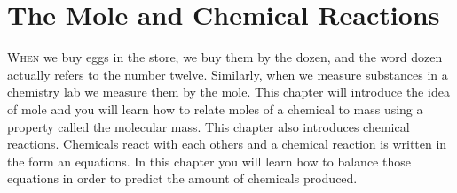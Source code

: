 \documentclass[main.tex]{subfiles}
\newcommand\chapterlabel{Ch-mole}\setcounter{figurenewcounter}{0}\setcounter{tablenewcounter}{0}\setcounter{formulanewcounter}{0}\chapterpicture{../{\chapterlabel}/figure1}\chapterpicturelabel{PngImg}
\begin{document}
 

\chapter[The Mole and Chemical Reactions ]{The Mole and Chemical Reactions}
%



\lettrine[lines=4]{\color{black!45}W}{hen} we buy eggs in the store, we buy them by the dozen, and the word dozen actually refers to the number twelve. Similarly, when we measure substances in a chemistry lab we measure them by the mole. This chapter will introduce the idea of mole and you will learn how to relate moles of a chemical to mass using a property called the molecular mass. This chapter also introduces chemical reactions. Chemicals react with each others and a chemical reaction is written in the form an equations. In this chapter you will learn how to balance those equations in order to predict the amount of chemicals produced.

%
%
%
% 
\end{document}
